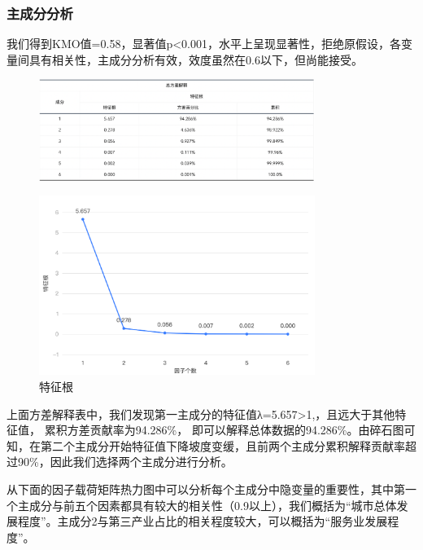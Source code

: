 \documentclass[12pt, a4paper, oneside]{ctexart}
\begin{document}
    \subsubsection{主成分分析}
    我们得到KMO值=0.58，显著值p<0.001，水平上呈现显著性，拒绝原假设，各变量间具有相关性，主成分分析有效，效度虽然在0.6以下，但尚能接受。
    \begin{figure}[h]
        \centering
        \includegraphics[width=0.8\textwidth]{pic/KMO.png}
        \label{fig:方差解释表}
    \end{figure}
    \begin{figure}[h]
        \centering
        \includegraphics[width=0.8\textwidth]{pic/特征根.png}
        \caption{特征根}
        \label{fig:特征根}
    \end{figure}

    上面方差解释表中，我们发现第一主成分的特征值λ=5.657>1,，且远大于其他特征值， 累积方差贡献率为94.286\%， 即可以解释总体数据的94.286\%。由碎石图可知，在第二个主成分开始特征值下降坡度变缓，且前两个主成分累积解释贡献率超过90\%，因此我们选择两个主成分进行分析。

    从下面的因子载荷矩阵热力图中可以分析每个主成分中隐变量的重要性，其中第一个主成分与前五个因素都具有较大的相关性（0.9以上），我们概括为“城市总体发展程度”。主成分2与第三产业占比的相关程度较大，可以概括为“服务业发展程度”。
    
\end{document}
